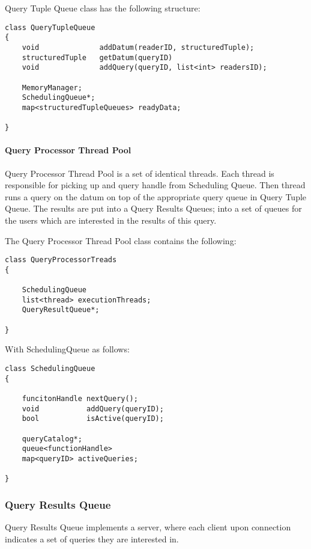 \documentclass[11pt]{article}
\begin{document}
Query Tuple Queue class has the following structure:

\begin{verbatim}
class QueryTupleQueue
{
    void              addDatum(readerID, structuredTuple);
    structuredTuple   getDatum(queryID)
    void              addQuery(queryID, list<int> readersID);

	MemoryManager;
	SchedulingQueue*;
	map<structuredTupleQueues> readyData;
	
}
\end{verbatim}

\paragraph{Query Processor Thread Pool}

Query Processor Thread Pool is a set of identical threads. Each thread is responsible for picking up and query handle from Scheduling Queue. Then thread runs a query on the datum on top of the appropriate query queue in Query Tuple Queue. The results are put into a Query Results Queues; into a set of queues for the users which are interested in the results of this query. 

The Query Processor Thread Pool class contains the following:

\begin{verbatim}
class QueryProcessorTreads
{
    
    SchedulingQueue
    list<thread> executionThreads;
    QueryResultQueue*;
	
}
\end{verbatim}

\noindent With SchedulingQueue as follows:

\begin{verbatim}
class SchedulingQueue
{
    
    funcitonHandle nextQuery();
    void           addQuery(queryID);
    bool           isActive(queryID);

    queryCatalog*;
    queue<functionHandle>
    map<queryID> activeQueries;
	
}
\end{verbatim}


\subsubsection{Query Results Queue}

Query Results Queue implements a server, where each client upon connection indicates a set of queries they are interested in.
\end{document}
